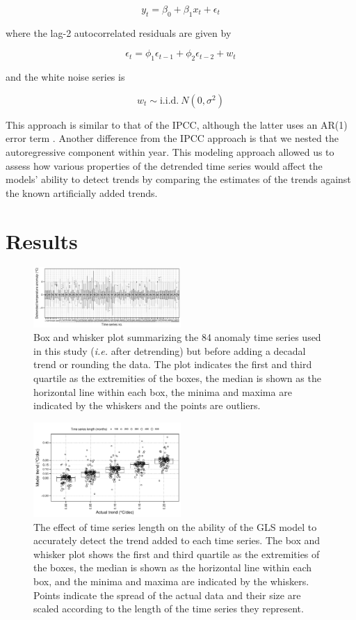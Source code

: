 \documentclass[twocol]{ametsoc}
\begin{document}
$$y_{t} = \beta_{0} + \beta_{1}x_{t} + \epsilon_{t}$$

where the lag-2 autocorrelated residuals are given by

$$\epsilon_{t} = \phi_{1}\epsilon_{t-1} + \phi_{2}\epsilon_{t-2} + w_{t}$$

and the white noise series is

$$w_{t} \sim \mathrm{i.i.d.}~N(0,\sigma^{2})$$

This approach is similar to that of the IPCC, although the latter uses an AR(1) error term \citep{IPCC2013supp}. Another difference from the IPCC approach is that we nested the autoregressive component within year. This modeling approach allowed us to assess how various properties of the detrended time series would affect the models' ability to detect trends by comparing the estimates of the trends against the known artificially added trends.

\section{Results}

\begin{figure}
\centering \includegraphics[width=0.50\textwidth]{figure02}
\caption{Box and whisker plot summarizing the 84 anomaly time series used in this study (\emph{i.e.} after detrending) but before adding a decadal trend or rounding the data. The plot indicates the first and third quartile as the extremities of the boxes, the median is shown as the horizontal line within each box, the minima and maxima are indicated by the whiskers and the points are outliers.}
\label{figure02}
\end{figure}

\begin{figure}
\centering \includegraphics[width=0.50\textwidth]{figure03}
\caption{The effect of time series length on the ability of the GLS model to accurately detect the trend added to each time series. The box and whisker plot shows the first and third quartile as the extremities of the boxes, the median is shown as the horizontal line within each box, and the minima and maxima are indicated by the whiskers. Points indicate the spread of the actual data and their size are scaled according to the length of the time series they represent.}
\label{figure03}
\end{figure}
\end{document}
